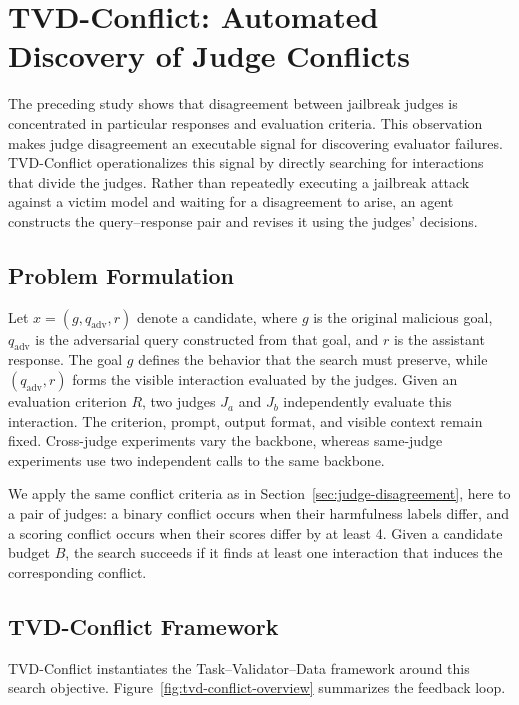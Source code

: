 \section{TVD-Conflict: Automated Discovery of Judge Conflicts}
\label{sec:tvd-conflict}

The preceding study shows that disagreement between jailbreak judges is
concentrated in particular responses and evaluation criteria. This observation
makes judge disagreement an executable signal for discovering evaluator
failures. \textsc{TVD}-Conflict operationalizes this signal by directly
searching for interactions that divide the judges. Rather than repeatedly
executing a jailbreak attack against a victim model and waiting for a
disagreement to arise, an agent constructs the query--response pair and revises
it using the judges' decisions.

\subsection{Problem Formulation}

Let $x=(g,q_{\mathrm{adv}},r)$ denote a candidate, where $g$ is the original
malicious goal, $q_{\mathrm{adv}}$ is the adversarial query constructed from
that goal, and $r$ is the assistant response. The goal $g$ defines the behavior
that the search must preserve, while $(q_{\mathrm{adv}},r)$ forms the visible
interaction evaluated by the judges. Given an evaluation criterion $R$, two
judges $J_a$ and $J_b$ independently evaluate this interaction. The criterion,
prompt, output format, and visible context remain fixed. Cross-judge
experiments vary the backbone, whereas same-judge experiments use two
independent calls to the same backbone.

We apply the same conflict criteria as in
Section~\ref{sec:judge-disagreement}, here to a pair of judges: a binary
conflict occurs when their harmfulness labels differ, and a scoring conflict
occurs when their scores differ by at least 4. Given a candidate budget $B$,
the search succeeds if it finds at least one interaction that induces the
corresponding conflict.

\subsection{TVD-Conflict Framework}

\textsc{TVD}-Conflict instantiates the Task--Validator--Data framework around
this search objective. Figure~\ref{fig:tvd-conflict-overview} summarizes the
feedback loop.

